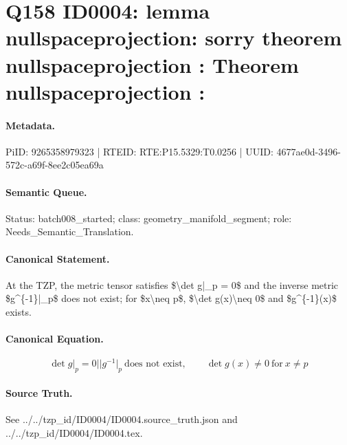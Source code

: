 \section*{Q158 ID0004: lemma nullspaceprojection: sorry theorem nullspaceprojection : Theorem nullspaceprojection :}
\paragraph{Metadata.}
PiID: 9265358979323 | RTEID: RTE:P15.5329:T0.0256 | UUID: 4677ae0d-3496-572c-a69f-8ee2c05ea69a

\paragraph{Semantic Queue.}
Status: batch008\_started; class: geometry\_manifold\_segment; role: Needs\_Semantic\_Translation.

\paragraph{Canonical Statement.}
At the TZP, the metric tensor satisfies \$\textbackslash{}det g|\_p = 0\$ and the inverse metric \$g\textasciicircum{}\{-1\}|\_p\$ does not exist; for \$x\textbackslash{}neq p\$, \$\textbackslash{}det g(x)\textbackslash{}neq 0\$ and \$g\textasciicircum{}\{-1\}(x)\$ exists.

\paragraph{Canonical Equation.}
\[
\det g\vert_{p}=0 || g^{-1}\vert_{p}\ \text{does not exist}, \qquad \det g(x)\neq 0 \ \text{for}\ x\neq p
\]

\paragraph{Source Truth.}
See ../../tzp\_id/ID0004/ID0004.source\_truth.json and ../../tzp\_id/ID0004/ID0004.tex.
